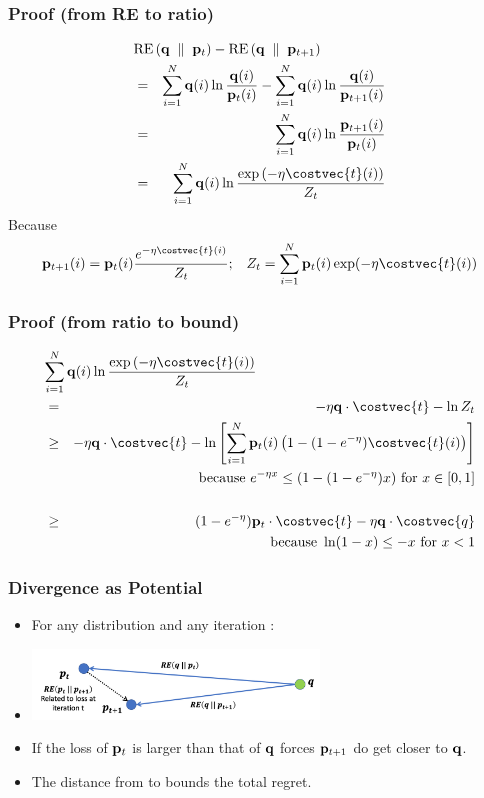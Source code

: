 \documentclass{beamer}
\begin{document}
\begingroup
\small
\begin{frame}
\frametitle{Proof (from RE to ratio)}
\begin{eqnarray*}
\lefteqn{\RE{\vecq}{\vecp_{t}} - \RE{\vecq}{\vecp_{t+1}}} \cr
  &=& \sum_{i=1}^N \vecq(i) \ln \frac{\vecq(i)}{\vecp_t(i)} -
      \sum_{i=1}^N \vecq(i) \ln \frac{\vecq(i)}{\vecp_{t+1}(i)} \cr
  & = & \sum_{i=1}^N \vecq(i) \ln \frac{\vecp_{t+1}(i)}{\vecp_t(i)}
        \cr
  & = & \sum_{i=1}^N \vecq(i) \ln \frac{\exp \left( -\eta
        \costvec{t}(i) \right)}{Z_t}
\end{eqnarray*}
Because
\[
\vecp_{t+1}(i) = \vecp_{t}(i)
\frac{e^{-\eta \costvec{t}(i)}}{Z_t};\;\;\;
Z_t = \sum_{i=1}^N \vecp_t(i)
        \exp( -\eta \costvec{t}(i))
  \]
\end{frame}

\begin{frame}
\frametitle{Proof (from ratio to bound)}
\begin{eqnarray*}
\lefteqn{\sum_{i=1}^N \vecq(i) \ln \frac{\exp \left( -\eta
  \costvec{t}(i) \right)}{Z_t}} \cr
  &=& -\eta \vecq \cdot \costvec{t} - \ln Z_t \cr
  &\geq& -\eta \vecq \cdot \costvec{t} - \ln\left[ \sum_{i=1}^N
         \vecp_t(i) \left(1-(1-e^{-\eta})\costvec{t}(i)
         \right)\right] \cr
  && \mbox{because } e^{-\eta x} \leq (1-(1-e^{-\eta})x) \mbox{ for } x
     \in [0,1] \cr \cr
     & \geq & (1 - e^{-\eta}) \vecp_t \cdot \costvec{t} - \eta \vecq
              \cdot \costvec{q} \cr
  && \mbox{because } \ln (1-x) \leq -x \mbox{ for } x<1
\end{eqnarray*}
\end{frame}

\endgroup

\newcommand{\grad}{\bigtriangledown}

\begin{frame}
\frametitle{Divergence as Potential}
\begin{itemize}
    \item For any distribution \R{$\vecq$} and any iteration 
    \B{$\ouralg$}:
\item
  \includegraphics[width=3in]{figures/divergenceAsPotential.png}
\item If the loss of ${\bf p}_{t}$ is larger than that of $\vecq$ forces
  ${\bf p}_{t+1}$ do get closer to $\vecq$.
\item The distance from  to \R{$\vecq^*$} bounds the total regret. 
\end{itemize}
\end{frame}
\end{document}
